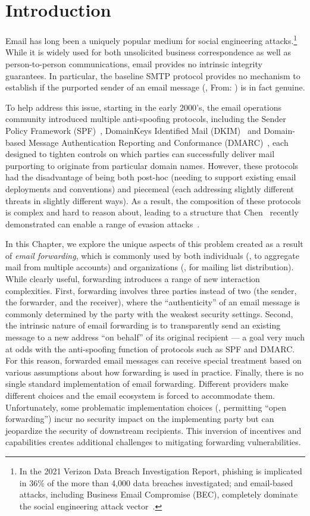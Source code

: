 \section{Introduction}
Email has long been a uniquely popular medium for social engineering
attacks.\footnote{In the 2021 Verizon Data Breach Investigation
  Report, phishing is implicated in 36\% of the more than 4,000 data
  breaches investigated; and email-based attacks, including Business
  Email Compromise (BEC), completely dominate the social engineering
  attack vector~\cite{dbir2021}.}  While it is widely used for
both unsolicited business correspondence as well as person-to-person
communications, email provides no intrinsic integrity guarantees.  In
particular, the baseline SMTP protocol provides no mechanism to
establish if the purported sender of an email message (\eg, From:
) is in fact genuine.

To help address this issue, starting in the early 2000's, the email
operations community introduced multiple anti-spoofing protocols,
including the Sender Policy Framework (SPF)~\cite{rfc7208}, DomainKeys
Identified Mail
(DKIM)~\cite{rfc6376} and Domain-based Message Authentication
Reporting and Conformance (DMARC)~\cite{rfc7489}, each designed to
tighten controls on which parties can successfully deliver
mail purporting to originate from particular domain names.  However,
these protocols had the disadvantage of being both post-hoc (needing
to support existing email deployments and conventions) and piecemeal
(each addressing slightly different threats in slightly different
ways).  As a result, the composition of these protocols is complex and
hard to reason about, leading to a structure that Chen \etal\ recently
demonstrated can enable a range of evasion
attacks~\cite{chen2020composition}.

In this Chapter, we explore the unique aspects of this problem created
as a result of \emph{email forwarding}, which is commonly used by both
individuals (\ie, to aggregate mail from multiple accounts) and
organizations (\ie, for mailing list distribution).  While clearly
useful, forwarding introduces a range of new interaction
complexities. First, forwarding involves three parties instead of two
(the sender, the forwarder, and the receiver), where the
``authenticity'' of an email message is commonly determined by the party with
the weakest security settings.  Second, the intrinsic nature of email
forwarding is to transparently send an existing message to a new
address ``on behalf'' of its original recipient --- a goal very much
at odds with the anti-spoofing function of protocols such as SPF and
DMARC.  For this reason, forwarded email messages can receive special
treatment based on various assumptions about how forwarding is used in
practice.  Finally, there is no single standard implementation of
email forwarding. Different providers make different choices and the
email ecosystem is forced to accommodate them.  Unfortunately, some
problematic implementation choices (\eg, permitting ``open
forwarding'') incur no security impact on the implementing party but
can jeopardize the security of downstream recipients.  This inversion of
incentives and capabilities creates additional challenges to
mitigating forwarding vulnerabilities.

